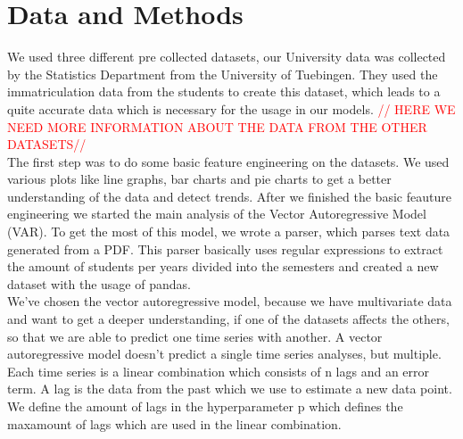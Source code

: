 \documentclass{article}
\theoremstyle{plain}
\theoremstyle{definition}
\theoremstyle{remark}
\begin{document}
\section{Data and Methods}\label{sec:methods}
We used three different pre collected datasets, our University data was collected by the Statistics Department from the University of Tuebingen. 
They used the immatriculation data from the students to create this dataset, which leads to
a quite accurate data which is necessary for the usage in our models.
\textcolor{red}{// HERE WE NEED MORE INFORMATION ABOUT THE DATA FROM THE OTHER DATASETS//}\\
The first step was to do some basic feature engineering on the datasets. We used various plots like line graphs, bar charts and pie charts
to get a better understanding of the data and detect trends. 
After we finished the basic feauture engineering we started the main analysis of the Vector Autoregressive Model (VAR). 
To get the most of this model, we wrote a parser, which parses text data generated from a PDF. This parser basically uses regular expressions to extract the amount of students
per years divided into the semesters and created a new dataset with the usage of pandas.\\
We've chosen the vector autoregressive model, because we have multivariate data and want to get a deeper understanding, if one of the datasets affects the others, 
so that we are able to predict one time series with another. A vector autoregressive model doesn't predict a single time series analyses, 
but multiple. Each time series is a linear combination which consists of n lags and an error term. A lag is the data from the past which we use to estimate
a new data point. We define the amount of lags in the hyperparameter p which defines the maxamount of lags which are used in the linear combination.
\end{document}
